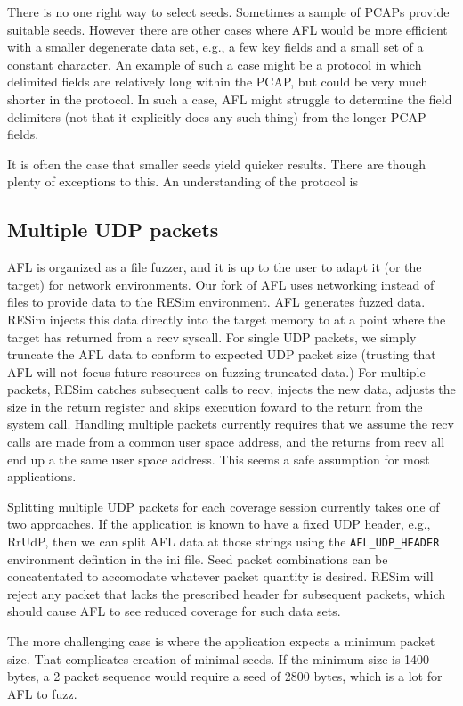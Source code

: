 \documentclass[titlepage]{article}
\begin{document}
There is no one right way to select seeds.  Sometimes a sample of PCAPs provide suitable seeds.  However there are other cases where AFL would
be more efficient with a smaller degenerate data set, e.g., a few key fields and a small set of a constant character.  An example of such a case
might be a protocol in which delimited fields are relatively long within the PCAP, but could be very much shorter in the protocol.  In such a case,
AFL might struggle to determine the field delimiters (not that it explicitly does any such thing) from the longer PCAP fields.

It is often the case that smaller seeds yield quicker results.  There are though plenty of exceptions to this.  An understanding of the protocol is 

\subsection{Multiple UDP packets}
AFL is organized as a file fuzzer, and it is up to the user to adapt it (or the target) for network environments.
Our fork of AFL uses networking instead of files to provide data to the RESim environment.
AFL generates fuzzed data.  RESim injects this data directly into the target memory to at a point where the target has returned from a recv syscall.
For single UDP packets, we simply truncate the AFL data to conform to expected UDP packet size (trusting that AFL will not focus future resources on fuzzing 
truncated data.)    For multiple packets, RESim catches subsequent calls to recv, injects the new data, adjusts the size in the
return register and skips execution foward to the return from the system call.
Handling multiple packets currently requires that we assume the recv calls are made from a common user space address, and
the returns from recv all end up a the same user space address.  This seems a safe assumption for most applications.  

Splitting multiple UDP packets for each coverage session currently takes one of two approaches.  If the application is known
to have a fixed UDP header, e.g., RrUdP, then we can split AFL data at those strings using the {\tt AFL\_UDP\_HEADER} environment
defintion in the ini file.  Seed packet combinations can be concatentated
to accomodate whatever packet quantity is desired.  RESim will reject any packet that lacks the prescribed header for subsequent
packets, which should cause AFL
to see reduced coverage for such data sets.

The more challenging case is where the application expects a minimum packet size.  That complicates creation of minimal seeds.  If the
minimum size is 1400 bytes, a 2 packet sequence would require a seed of 2800 bytes, which is a lot for AFL to fuzz.
\end{document}
